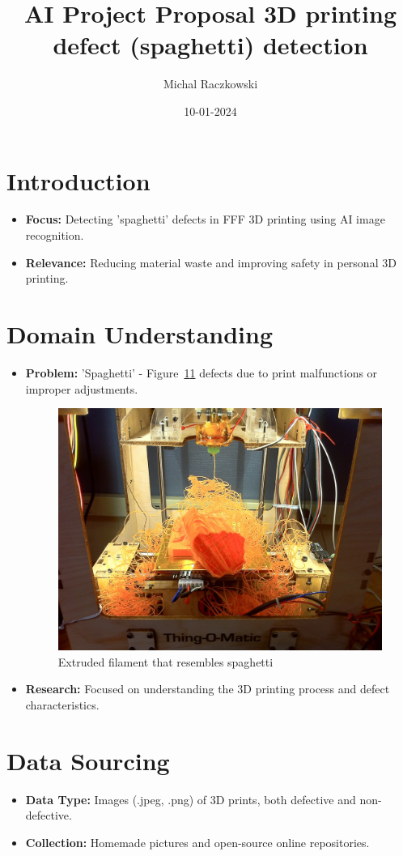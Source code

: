 \documentclass[12pt,a4paper]{article}
\title{\textbf{AI Project Proposal 3D printing defect (spaghetti) detection }}
\author{Michal Raczkowski}
\date{10-01-2024}
\begin{document}
\maketitle
\thispagestyle{empty} %

\newpage
\tableofcontents
\newpage

\setcounter{page}{1} %

\section{Introduction}
\begin{itemize}
    \item \textbf{Focus:} Detecting 'spaghetti' defects in FFF 3D printing using AI image recognition.
    \item \textbf{Relevance:} Reducing material waste and improving safety in personal 3D printing.
\end{itemize}

\section{Domain Understanding}
\begin{itemize}
    \item \textbf{Problem:} 'Spaghetti' - Figure~\ref{fig:spaghetti3D}\ref{fig:spaghetti3D} defects due to print malfunctions or improper adjustments.
    \begin{figure}[h]
    \centering
    \includegraphics[width=0.5\linewidth]{spaghetti3D.jpg}
    \caption{Extruded filament that resembles spaghetti}
    \label{fig:spaghetti3D}
    \end{figure}

    \item \textbf{Research:} Focused on understanding the 3D printing process and defect characteristics.
\end{itemize}

\section{Data Sourcing}
\begin{itemize}
    \item \textbf{Data Type:} Images (.jpeg, .png) of 3D prints, both defective and non-defective.
    \item \textbf{Collection:} Homemade pictures and open-source online repositories.
\end{itemize}
\end{document}
